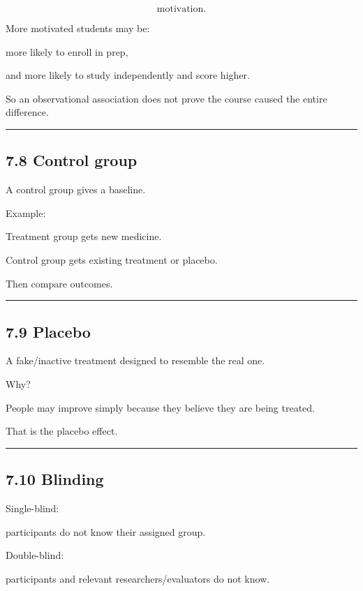\documentclass[
]{article}
\begin{document}
\[
\boxed{\text{motivation}}.
\]

More motivated students may be:

more likely to enroll in prep,

and more likely to study independently and score higher.

So an observational association does not prove the course caused the
entire difference.

\begin{center}\rule{0.5\linewidth}{0.5pt}\end{center}

\subsection{7.8 Control group}\label{control-group}

A control group gives a baseline.

Example:

Treatment group gets new medicine.

Control group gets existing treatment or placebo.

Then compare outcomes.

\begin{center}\rule{0.5\linewidth}{0.5pt}\end{center}

\subsection{7.9 Placebo}\label{placebo}

A fake/inactive treatment designed to resemble the real one.

Why?

People may improve simply because they believe they are being treated.

That is the placebo effect.

\begin{center}\rule{0.5\linewidth}{0.5pt}\end{center}

\subsection{7.10 Blinding}\label{blinding}

Single-blind:

participants do not know their assigned group.

Double-blind:

participants and relevant researchers/evaluators do not know.
\end{document}
